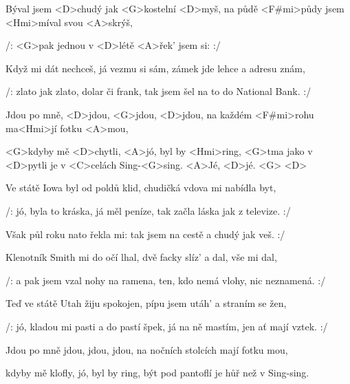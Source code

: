

\zs
Býval jsem <D>chudý jak <G>kostelní <D>myš,
na půdě <F#mi>půdy jsem <Hmi>míval svou <A>skrýš,

/: <G>pak jednou v <D>létě <A>řek' jsem si:  :/
\ks

\zs
Když mi dát nechceš, já vezmu si sám,
zámek jde lehce a adresu znám,

/: zlato jak zlato, dolar či frank,
tak jsem šel na to do National Bank. :/
\ks

\zr
Jdou po mně, <D>jdou, <G>jdou, <D>jdou,
na každém <F#mi>rohu ma<Hmi>jí fotku <A>mou,

<G>kdyby mě <D>chytli, <A>jó, byl by <Hmi>ring,
<G>tma jako v <D>pytli je v <C>celách Sing-<G>sing. <A>Jé, <D>jé. <G> <D>
\kr

\zs
Ve státě Iowa byl od poldů klid,
chudičká vdova mi nabídla byt,

/: jó, byla to kráska, já měl peníze,
tak začla láska jak z televize. :/
\ks

\zs
Však půl roku nato řekla mi: 
tak jsem na cestě a chudý jak veš. :/
\ks

\zr \kr

\zs
Klenotník Smith mi do očí lhal,
dvě facky slíz' a dal, vše mi dal,

/: a pak jsem vzal nohy na ramena,
ten, kdo nemá vlohy, nic neznamená. :/
\ks

\zs
Teď ve státě Utah žiju spokojen,
pípu jsem utáh' a straním se žen,

/: jó, kladou mi pasti a do pastí špek,
já na ně mastím, jen ať mají vztek. :/
\ks

\zr
Jdou po mně jdou, jdou, jdou,
na nočních stolcích mají fotku mou,

kdyby mě klofly, jó, byl by ring,
být pod pantoflí je hůř než v Sing-sing.
\kr

\kp





